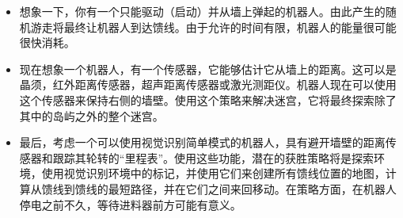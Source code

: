
\begin{itemize}
\item 想象一下，你有一个只能驱动（启动）并从墙上弹起的机器人。由此产生的随机游走将最终让机器人到达馈线。由于允许的时间有限，机器人的能量很可能很快消耗。
\item 现在想象一个机器人，有一个传感器，它能够估计它从墙上的距离。这可以是晶须，红外距离传感器，超声距离传感器或激光测距仪。机器人现在可以使用这个传感器来保持右侧的墙壁。使用这个策略来解决迷宫，它将最终探索除了其中的岛屿之外的整个迷宫。
\item 最后，考虑一个可以使用视觉识别简单模式的机器人，具有避开墙壁的距离传感器和跟踪其轮转的“里程表”。使用这些功能，潜在的获胜策略将是探索环境，使用视觉识别环境中的标记，并使用它们来创建所有馈线位置的地图，计算从馈线到馈线的最短路径，并在它们之间来回移动。在策略方面，在机器人停电之前不久，等待进料器前方可能有意义。
\end{itemize}

